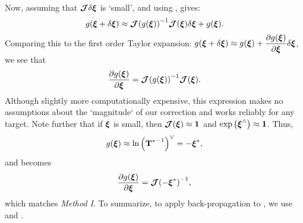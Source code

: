 \noindent Now, assuming that $\boldsymbol{\mathbf{\mathcal{J}}} \delta \boldsymbol{\mathbf{\xi}}$ is `small', and using ,  gives: 
\begin{equation}
	g({\boldsymbol{\mathbf{\xi}} + \delta \boldsymbol{\mathbf{\xi}}}) \approx {  \boldsymbol{\mathbf{\mathcal{J}}}  (g({  \boldsymbol{\mathbf{\xi}}  }))}^{-1} \boldsymbol{\mathbf{\mathcal{J}}}( \boldsymbol{\mathbf{\xi}}) \delta \boldsymbol{\mathbf{\xi}} + g({\boldsymbol{\mathbf{\xi}}}).
\end{equation}
Comparing this to the first order Taylor expansion: $g({\boldsymbol{\mathbf{\xi}} + \delta \boldsymbol{\mathbf{\xi}}}) \approx g({\boldsymbol{\mathbf{\xi}}}) +  \dfrac{\partial g({\boldsymbol{\mathbf{\xi}}})}{\partial \boldsymbol{\mathbf{\xi}}} \delta \boldsymbol{\mathbf{\xi}}$, we see that
\begin{equation}
	\label{eq:logjacob_method2}
	\dfrac{\partial g({\boldsymbol{\mathbf{\xi}}})}{\partial \boldsymbol{\mathbf{\xi}}} = {\boldsymbol{\mathbf{\mathcal{J}}}(g({\boldsymbol{\mathbf{\xi}}}))}^{-1} \boldsymbol{\mathbf{\mathcal{J}}}( \boldsymbol{\mathbf{\xi}}).
\end{equation}
Although slightly more computationally expensive, this expression makes no assumptions about the `magnitude` of our correction and works reliably for any target. Note further that if $\boldsymbol{\mathbf{\xi}}$ is small, then $\boldsymbol{\mathbf{\mathcal{J}}}( \boldsymbol{\mathbf{\xi}}) \approx \boldsymbol{\mathbf{1}}$ and $\text{exp}\left({\boldsymbol{\mathbf{\xi}}}^{\wedge}\right) \approx \boldsymbol{\mathbf{1}}$. Thus,
\begin{equation}
	g({\boldsymbol{\mathbf{\xi}}}) \approx \text{ln}\left({{\boldsymbol{\mathbf{T}}^*}^{-1}} \right)^{\vee} = -\boldsymbol{\mathbf{\xi}}^*,
\end{equation}
and  becomes
\begin{equation}
	\dfrac{\partial g({\boldsymbol{\mathbf{\xi}}})}{\partial \boldsymbol{\mathbf{\xi}}} = {\boldsymbol{\mathbf{\mathcal{J}}}(-\boldsymbol{\mathbf{\xi}}^*)}^{-1}, 
\end{equation}
which matches \textit{Method I}. To summarize, to apply back-propagation to , we use  and .


